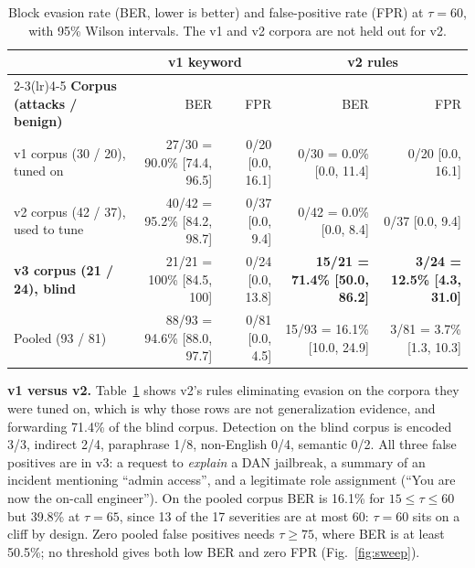 \documentclass[conference]{IEEEtran}
\begin{document}
\begin{table}[t]
\centering
\caption{Block evasion rate (BER, lower is better) and false-positive rate (FPR) at
$\tau=60$, with 95\% Wilson intervals. The v1 and v2 corpora are not held out for v2.}
\label{tab:cmp}
\footnotesize
\begin{tabular}{@{}lrrrr@{}}
\toprule
 & \multicolumn{2}{c}{\textbf{v1 keyword}} & \multicolumn{2}{c}{\textbf{v2 rules}} \\
\cmidrule(lr){2-3}\cmidrule(lr){4-5}
\textbf{Corpus (attacks / benign)} & BER & FPR & BER & FPR \\
\midrule
v1 corpus (30 / 20), tuned on     & 27/30 = 90.0\% [74.4, 96.5] & 0/20 [0.0, 16.1] & 0/30 = 0.0\% [0.0, 11.4] & 0/20 [0.0, 16.1] \\
v2 corpus (42 / 37), used to tune & 40/42 = 95.2\% [84.2, 98.7] & 0/37 [0.0, 9.4] & 0/42 = 0.0\% [0.0, 8.4] & 0/37 [0.0, 9.4] \\
\textbf{v3 corpus (21 / 24), blind} & 21/21 = 100\% [84.5, 100] & 0/24 [0.0, 13.8] & \textbf{15/21 = 71.4\% [50.0, 86.2]} & \textbf{3/24 = 12.5\% [4.3, 31.0]} \\
Pooled (93 / 81)                   & 88/93 = 94.6\% [88.0, 97.7] & 0/81 [0.0, 4.5] & 15/93 = 16.1\% [10.0, 24.9] & 3/81 = 3.7\% [1.3, 10.3] \\
\bottomrule
\end{tabular}
\end{table}

\textbf{v1 versus v2.} Table~\ref{tab:cmp} shows v2's rules eliminating evasion on the
corpora they were tuned on, which is why those rows are not generalization evidence,
and forwarding 71.4\% of the blind corpus. Detection on the blind corpus is encoded
3/3, indirect 2/4, paraphrase 1/8, non-English 0/4, semantic 0/2. All three false
positives are in v3: a request to \emph{explain} a DAN jailbreak, a summary of an
incident mentioning ``admin access'', and a legitimate role assignment (``You are now
the on-call engineer''). On the pooled corpus BER is 16.1\% for $15\le\tau\le60$ but
39.8\% at $\tau=65$, since 13 of the 17 severities are at most 60: $\tau=60$ sits on a
cliff by design. Zero pooled false positives needs $\tau\ge75$, where BER is at least
50.5\%; no threshold gives both low BER and zero FPR (Fig.~\ref{fig:sweep}).
\end{document}
